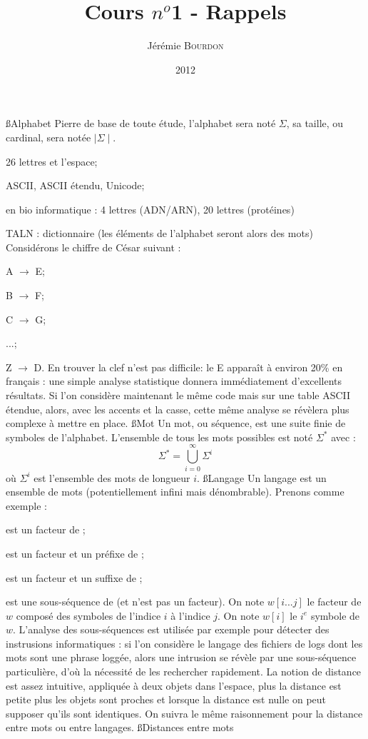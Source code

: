 \documentclass[a4paper,11pt]{article}
\begin{document}
\title{Cours $n^o$1 - Rappels}
\author{Jérémie \textsc{Bourdon}}
\date{2012}
\maketitle
{}
 \ss{Alphabet}
  \p Pierre de base de toute étude, l'alphabet sera noté $\Sigma$, sa
  taille, ou cardinal, sera notée $\mid\Sigma\mid$.
  \bi
   \item 26 lettres et l'espace;
   \item ASCII, ASCII étendu, Unicode;
   \item en bio informatique : 4 lettres (ADN/ARN), 20 lettres (protéines)
   \item TALN : dictionnaire (les éléments de l'alphabet seront alors des mots)
  \ei
  \p Considérons le chiffre de César suivant :\\
  \bi
   \item A $\rightarrow$ E;
   \item B $\rightarrow$ F;
   \item C $\rightarrow$ G;
   \item ...;
   \item Z $\rightarrow$ D.
  \ei
  \p En trouver la clef n'est pas difficile: le E apparaît à environ 20\%{} en
  français : une simple analyse statistique donnera immédiatement
  d'excellents résultats. Si l'on considère maintenant le même code mais sur une
  table ASCII étendue, alors, avec les accents et la casse, cette même analyse se
  révèlera plus complexe à mettre en place.
 \ss{Mot}
 \p Un mot, ou séquence, est une suite finie de symboles de l'alphabet. L'ensemble
 de tous les mots possibles est noté $\Sigma^*$ avec :
 \[
 \Sigma^* = \bigcup^{\infty}_{i = 0} \Sigma^i
 \]
 où $\Sigma^i$ est l'ensemble des mots de longueur $i$.
 \ss{Langage}
 \p Un langage est un ensemble de mots (potentiellement infini mais dénombrable).
 \p Prenons comme exemple  :\\
 \bi
  \item {} est un facteur de ;
  \item {} est un facteur et un préfixe de ;
  \item {} est un facteur et un suffixe de ;
  \item {} est une sous-séquence de  (et n'est pas un facteur).
 \ei
 \p On note $w[i...j]$ le facteur de $w$ composé des symboles de l'indice $i$ à
 l'indice $j$. On note $w[i]$ le $i^{e}$ symbole de $w$.
 \p L'analyse des sous-séquences est utilisée par exemple pour détecter des
 instrusions informatiques : si l'on considère le langage des fichiers de logs
 dont les mots sont une phrase loggée, alors une intrusion se révèle par une
 sous-séquence particulière, d'où la nécessité de les rechercher rapidement.
 La notion de distance est assez intuitive, appliquée à deux objets
 dans l'espace, plus la distance est petite plus les objets sont
 proches et lorsque la distance est nulle on peut supposer qu'ils sont
 identiques. On suivra le même raisonnement pour la distance entre
 mots ou entre langages.
 \ss{Distances entre mots}
\end{document}
